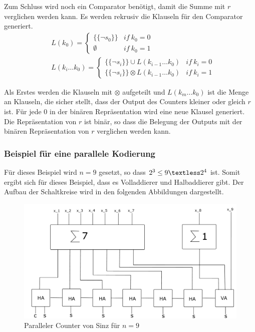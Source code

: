 \documentclass[a4,abstract=on]{scrartcl}
\begin{document}
Zum Schluss wird noch ein Comparator benötigt, damit die Summe mit $r$ verglichen werden kann. Es werden rekrusiv die Klauseln für den Comparator generiert.
\begin{align*}
&L(k_0) = \begin{cases} \{\{\neg s_0\}\} & if{~}k_0 = 0\\ \emptyset & if{~}k_0=1\end{cases}\\
&L(k_i \dots k_0) = \begin{cases} \{\{\neg s_i\}\}\cup L(k_{i-1} \dots k_0) & if{~}k_i = 0\\  \{\{\neg s_i\}\}\otimes L(k_{i-1} \dots k_0) & if{~}k_i = 1\end{cases}
\end{align*}

Als Erstes werden die Klauseln mit $\otimes$ aufgeteilt und $L(k_{m} \dots k_0)$ ist die Menge an Klauseln, die sicher stellt, dass der Output des Counters kleiner oder gleich $r$ ist. Für jede $0$ in der binären Repräsentation wird eine neue Klausel generiert.
Die Repräsentation von $r$ ist binär, so dass die Belegung der Outputs mit der binären Repräsentation von $r$ verglichen werden kann.

\subsubsection*{Beispiel für eine parallele Kodierung}
Für dieses Beispiel wird $n=9$ gesetzt, so dass $2^3 \leq 9 \textless 2^4$ ist. Somit ergibt sich für dieses Beispiel, dass es Volladdierer und Halbaddierer gibt. Der Aufbau der Schaltkreise wird in den folgenden Abbildungen dargestellt.

\begin{figure}[H]
\centering
\includegraphics[width=\textwidth]{Bsp_Sinz_grob.pdf}
\caption{Paralleler Counter von Sinz für $n=9$}
\label{fig:sinz_counter_para_bsp}
\end{figure}
\end{document}
